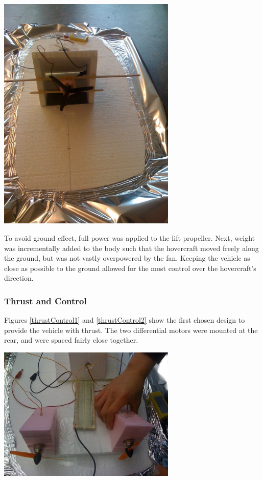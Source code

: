 \begin{minipage}{6.5in}
  \begin{center}
    \includegraphics[width=85mm]{imageSources/lift2.png}
  \end{center}
  \label{lift2}
\end{minipage}

To avoid ground effect, full power was applied to the lift propeller. Next, weight was incrementally added to the body such that the hovercraft moved freely along the ground, but was not vastly overpowered by the fan. Keeping the vehicle as close as possible to the ground allowed for the most control over the hovercraft's direction.

\subsubsection{Thrust and Control}

Figures \ref{thrustControl1} and \ref{thrustControl2} show the first chosen design to provide the vehicle with thrust. The two differential motors were mounted at the rear, and were spaced fairly close together.

\begin{minipage}{6.5in}
  \begin{center}
    \includegraphics[width=85mm]{imageSources/thrustControl1.png}
  \end{center}
  \label{thrustControl1}
\end{minipage}

